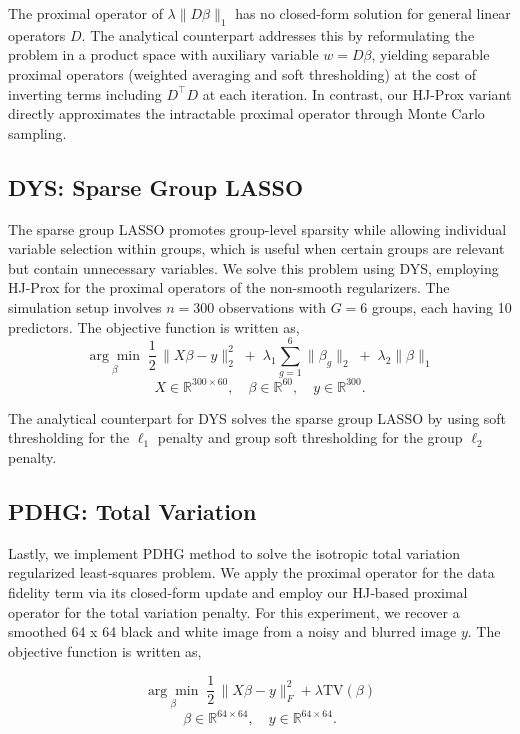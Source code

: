 \documentclass{article}
\theoremstyle{plain}
\theoremstyle{definition}
\theoremstyle{remark}
\begin{document}
The proximal operator of $\lambda\|D\beta\|_1$ has no closed-form solution for general linear operators $D$. The analytical counterpart addresses this by reformulating the problem in a product space with auxiliary variable $w = D\beta$, yielding separable proximal operators (weighted averaging and soft thresholding) at the cost of inverting terms including $D^\top D$ at each iteration. In contrast, our HJ-Prox variant directly approximates the intractable proximal operator through Monte Carlo sampling. 

\subsection{DYS: Sparse Group LASSO}
The sparse group LASSO promotes group-level sparsity while allowing individual variable selection within groups, which is useful when certain groups are relevant but contain unnecessary variables.
We solve this problem using DYS, employing HJ-Prox for the proximal operators of the non-smooth regularizers. The simulation setup involves $n=300$ observations with $G=6$ groups, each having 10 predictors. The objective function is written as, 
\begin{equation}
\underset{\beta}{\arg\min}\;
\frac{1}{2}\,\| X \beta - y\|_{2}^{2}
\;+\;\lambda_1\sum_{g=1}^{6}\| \beta_{g}\|_{2}
\;+\;\lambda_2\| \beta\|_{1}
\end{equation}
\[
X \in \mathbb{R}^{300 \times 60},\quad
\beta \in\mathbb{R}^{60},\quad
y\in\mathbb{R}^{300}.
\]

The analytical counterpart for DYS solves the sparse group LASSO by using soft thresholding for the $\ell_1$ penalty and group soft thresholding for the group $\ell_2$ penalty.
\subsection{PDHG: Total Variation}
Lastly, we implement PDHG method to solve the isotropic total variation regularized least‐squares problem. We apply the proximal operator for the data fidelity term via its closed‐form update and employ our HJ‐based proximal operator for the total variation penalty. For this experiment, we recover a smoothed 64 x 64 black and white image from a noisy and blurred image $y$. The objective function is written as, 

\begin{equation}
\underset{\beta}{\arg\min}\;
\frac{1}{2}\,\| X \beta - y\|_{F}^{2}
+\lambda \text{TV}(\beta)
\end{equation}
\[
\beta \in\mathbb{R}^{64 \times 64},\quad
y\in\mathbb{R}^{64 \times 64}.
\]
\end{document}
